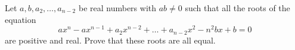 Let $a,b,a_2,\ldots,a_{n-2}$ be real numbers with $ab\ne0$ such that all the roots of the equation
$$ax^n-ax^{n-1}+a_2x^{n-2}+\ldots+a_{n-2}x^2-n^2bx+b=0$$are positive and real. Prove that these roots are all equal.